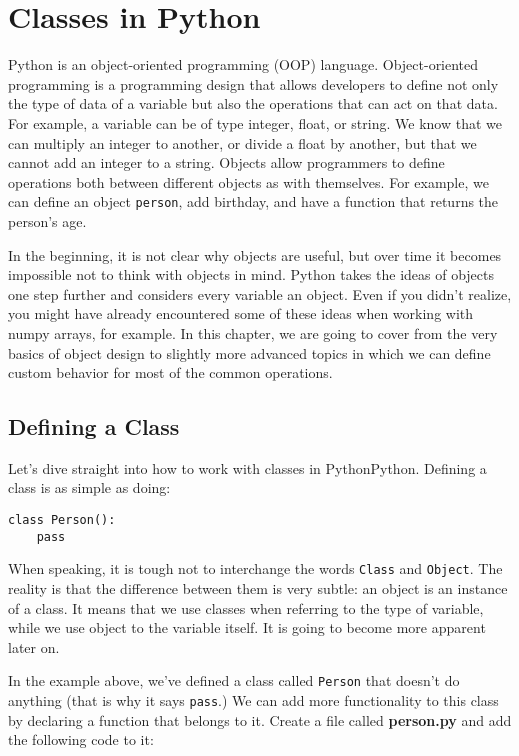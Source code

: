 \chapter{Classes in Python}\label{chapter:classes-in-python}
Python is an object-oriented programming (OOP) language. Object-oriented programming is a programming design that allows developers to define not only the type of data of a variable but also the operations that can act on that data. For example, a variable can be of type integer, float, or string. We know that we can multiply an integer to another, or divide a float by another, but that we cannot add an integer to a string. Objects allow programmers to define operations both between different objects as with themselves. For example, we can define an object \texttt{person}, add birthday, and have a function that returns the person's age.

In the beginning, it is not clear why objects are useful, but over time it becomes impossible not to think with objects in mind. Python takes the ideas of objects one step further and considers every variable an object. Even if you didn't realize, you might have already encountered some of these ideas when working with numpy arrays, for example. In this chapter, we are going to cover from the very basics of object design to slightly more advanced topics in which we can define custom behavior for most of the common operations.

\section{Defining a Class}\label{defining-a-class}
Let's dive straight into how to work with classes in PythonPython. Defining a class is as simple as doing:

\begin{verbatim}
class Person():
    pass
\end{verbatim}

When speaking, it is tough not to interchange the words \texttt{Class} and \texttt{Object}. The reality is that the difference between them is very subtle: an object is an instance of a class. It means that we use classes when referring to the type of variable, while we use object to the variable itself. It is going to become more apparent later on.

In the example above, we've defined a class called \texttt{Person} that doesn't do anything (that is why it says \texttt{pass}.) We can add more functionality to this class by declaring a function that belongs to it. Create a file called \textbf{person.py} and add the following code to it:

